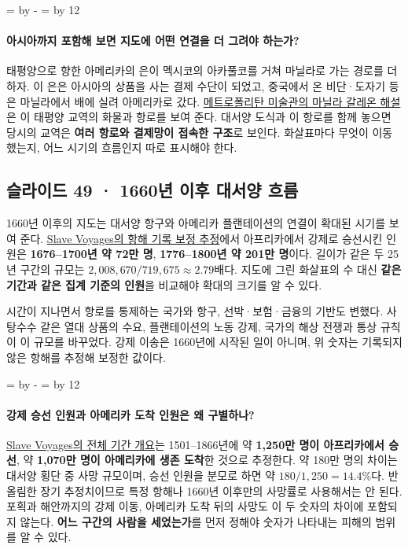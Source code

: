 \documentclass[10pt,a4paper]{article}
\newcommand{\ReserveQuestionSpace}{%
  \par\begingroup
  \dimen0=\pagegoal \advance\dimen0 by -\pagetotal
  \dimen2=\baselineskip \multiply\dimen2 by 12
  \ifdim\dimen0<\dimen2 \newpage\fi
  \endgroup}
\begin{document}
\ReserveQuestionSpace
\paragraph{아시아까지 포함해 보면 지도에 어떤 연결을 더 그려야 하는가?}
태평양으로 향한 아메리카의 은이 멕시코의 아카풀코를 거쳐 마닐라로 가는 경로를 더하자. 이 은은 아시아의 상품을 사는 결제 수단이 되었고, 중국에서 온 비단·도자기 등은 마닐라에서 배에 실려 아메리카로 갔다. \href{https://www.metmuseum.org/essays/the-manila-galleon-trade-1565-1815}{메트로폴리탄 미술관의 마닐라 갈레온 해설}은 이 태평양 교역의 화물과 항로를 보여 준다. 대서양 도식과 이 항로를 함께 놓으면 당시의 교역은 \textbf{여러 항로와 결제망이 접속한 구조}로 보인다. 화살표마다 무엇이 이동했는지, 어느 시기의 흐름인지 따로 표시해야 한다.\par

\subsection{슬라이드 49 · 1660년 이후 대서양 흐름}
1660년 이후의 지도는 대서양 항구와 아메리카 플랜테이션의 연결이 확대된 시기를 보여 준다. \href{https://legacy.slavevoyages.org/assessment/estimates}{Slave Voyages의 항해 기록 보정 추정}에서 아프리카에서 강제로 승선시킨 인원은 \textbf{1676–1700년 약 72만 명}, \textbf{1776–1800년 약 201만 명}이다. 길이가 같은 두 25년 구간의 규모는 $2{,}008{,}670/719{,}675\approx2.79$배다. 지도에 그린 화살표의 수 대신 \textbf{같은 기간과 같은 집계 기준의 인원}을 비교해야 확대의 크기를 알 수 있다.\par

시간이 지나면서 항로를 통제하는 국가와 항구, 선박·보험·금융의 기반도 변했다. 사탕수수 같은 열대 상품의 수요, 플랜테이션의 노동 강제, 국가의 해상 전쟁과 통상 규칙이 이 규모를 바꾸었다. 강제 이송은 1660년에 시작된 일이 아니며, 위 숫자는 기록되지 않은 항해를 추정해 보정한 값이다.\par

\ReserveQuestionSpace
\paragraph{강제 승선 인원과 아메리카 도착 인원은 왜 구별하나?}
\href{https://legacy.slavevoyages.org/blog/brief-overview-trans-atlantic-slave-trade}{Slave Voyages의 전체 기간 개요}는 1501–1866년에 약 \textbf{1,250만 명이 아프리카에서 승선}, 약 \textbf{1,070만 명이 아메리카에 생존 도착}한 것으로 추정한다. 약 180만 명의 차이는 대서양 횡단 중 사망 규모이며, 승선 인원을 분모로 하면 약 $180/1{,}250=14.4\%$다. 반올림한 장기 추정치이므로 특정 항해나 1660년 이후만의 사망률로 사용해서는 안 된다. 포획과 해안까지의 강제 이동, 아메리카 도착 뒤의 사망도 이 두 숫자의 차이에 포함되지 않는다. \textbf{어느 구간의 사람을 세었는가}를 먼저 정해야 숫자가 나타내는 피해의 범위를 알 수 있다.\par
\end{document}
